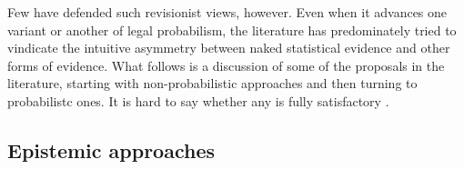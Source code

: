 \documentclass{article}
\begin{document}
 Few have defended such revisionist views, however. Even when it advances one variant or another of legal probabilism, the literature has predominately tried to vindicate the intuitive asymmetry between naked statistical evidence and other forms of evidence. %
What follows is a discussion of some of the proposals in the literature, starting with non-probabilistic approaches and then turning to probabilistc ones.  It is hard to say whether any  is fully satisfactory 
\citep{redmayne2008exploring}. 


\subsection{Epistemic approaches}
\label{subsec:epist}
\end{document}

